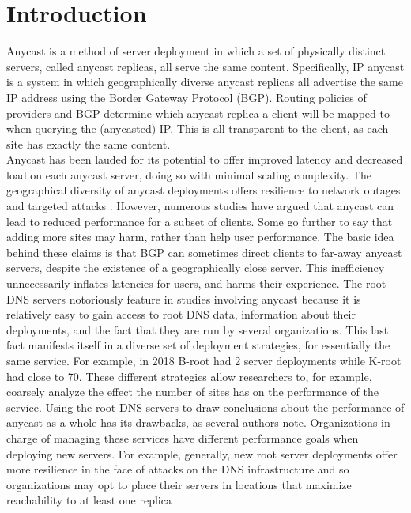 \documentclass[sigconf,nonacm,10pt]{acmart}
\begin{document}
\section{Introduction}\label{introduction-1}

Anycast is a method of server deployment in which a set of physically
distinct servers, called anycast replicas, all serve the same content.
Specifically, IP anycast is a system in which geographically diverse
anycast replicas all advertise the same IP address using the Border
Gateway Protocol (BGP). Routing policies of providers and BGP determine
which anycast replica a client will be mapped to when querying the
(anycasted) IP. This is all transparent to the client, as each site has
exactly the same content.\\
Anycast has been lauded for its potential to offer improved latency and
decreased load on each anycast server, doing so with minimal scaling
complexity. The geographical diversity of anycast deployments offers
resilience to network outages and targeted attacks
\cite{li_levin_spring_bhattacharjee_2018}. However, numerous studies
have argued that anycast can lead to reduced performance for a subset of
clients. Some go further to say that adding more sites may harm, rather
than help user performance. The basic idea behind these claims is that
BGP can sometimes direct clients to far-away anycast servers, despite
the existence of a geographically close server. This inefficiency
unnecessarily inflates latencies for users, and harms their experience.
The root DNS servers notoriously feature in studies involving anycast
because it is relatively easy to gain access to root DNS data,
information about their deployments, and the fact that they are run by
several organizations. This last fact manifests itself in a diverse set
of deployment strategies, for essentially the same service. For example,
in 2018 B-root had 2 server deployments while K-root had close to 70.
These different strategies allow researchers to, for example, coarsely
analyze the effect the number of sites has on the performance of the
service. Using the root DNS servers to draw conclusions about the
performance of anycast as a whole has its drawbacks, as several authors
note. Organizations in charge of managing these services have different
performance goals when deploying new servers. For example, generally,
new root server deployments offer more resilience in the face of attacks
on the DNS infrastructure and so organizations may opt to place their
servers in locations that maximize reachability to at least one replica
\end{document}
